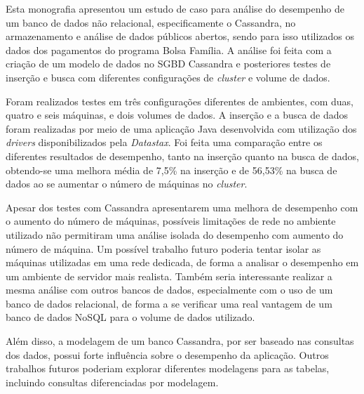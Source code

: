 Esta monografia apresentou um estudo de caso para análise do desempenho de um banco de dados não relacional, especificamente o Cassandra, no armazenamento e análise de dados públicos abertos, sendo para isso utilizados os dados dos pagamentos do programa Bolsa Família. A análise foi feita com a criação de um modelo de dados no SGBD Cassandra e posteriores testes de inserção e busca com diferentes configurações de \emph{cluster} e volume de dados.

Foram realizados testes em três configurações diferentes de ambientes, com duas, quatro e seis máquinas, e dois volumes de dados. A inserção e a busca de dados foram realizadas por meio de uma aplicação Java desenvolvida com utilização dos \emph{drivers} disponibilizados pela \emph{Datastax}. Foi feita uma comparação entre os diferentes resultados de desempenho, tanto na inserção quanto na busca de dados, obtendo-se uma melhora média de 7,5\% na inserção e de 56,53\% na busca de dados ao se aumentar o número de máquinas no \emph{cluster}.

Apesar dos testes com Cassandra apresentarem uma melhora de desempenho com o aumento do número de máquinas, possíveis limitações de rede no ambiente utilizado não permitiram uma análise isolada do desempenho com aumento do número de máquina. Um possível trabalho futuro poderia tentar isolar as máquinas utilizadas em uma rede dedicada, de forma a analisar o desempenho em um ambiente de servidor mais realista. Também seria interessante realizar a mesma análise com outros bancos de dados, especialmente com o uso de um banco de dados relacional, de forma a se verificar uma real vantagem de um banco de dados NoSQL para o volume de dados utilizado.

Além disso, a modelagem de um banco Cassandra, por ser baseado nas consultas dos dados, possui forte influência sobre o desempenho da aplicação. Outros trabalhos futuros poderiam explorar diferentes modelagens para as tabelas, incluindo consultas diferenciadas por modelagem.
